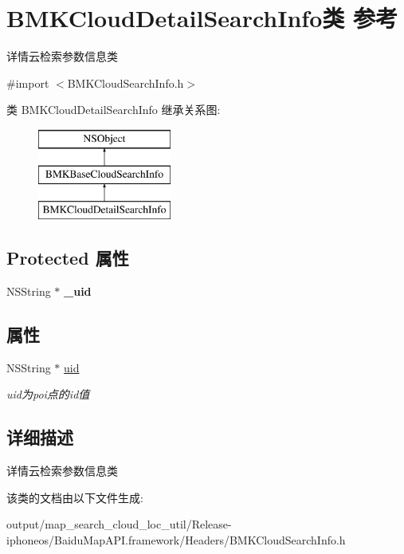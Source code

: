 \hypertarget{interface_b_m_k_cloud_detail_search_info}{}\section{B\+M\+K\+Cloud\+Detail\+Search\+Info类 参考}
\label{interface_b_m_k_cloud_detail_search_info}


详情云检索参数信息类  




{\ttfamily \#import $<$B\+M\+K\+Cloud\+Search\+Info.\+h$>$}

类 B\+M\+K\+Cloud\+Detail\+Search\+Info 继承关系图\+:\begin{figure}[H]
\begin{center}
\leavevmode
\includegraphics[height=3.000000cm]{interface_b_m_k_cloud_detail_search_info}
\end{center}
\end{figure}
\subsection*{Protected 属性}
\begin{DoxyCompactItemize}
\item 
\hypertarget{interface_b_m_k_cloud_detail_search_info_af0561e1d6ce5656002bb7b576ac51b4f}{}N\+S\+String $\ast$ {\bfseries \+\_\+uid}\label{interface_b_m_k_cloud_detail_search_info_af0561e1d6ce5656002bb7b576ac51b4f}

\end{DoxyCompactItemize}
\subsection*{属性}
\begin{DoxyCompactItemize}
\item 
\hypertarget{interface_b_m_k_cloud_detail_search_info_ad553991a75b6d30409a9d3525bea9c52}{}N\+S\+String $\ast$ \hyperlink{interface_b_m_k_cloud_detail_search_info_ad553991a75b6d30409a9d3525bea9c52}{uid}\label{interface_b_m_k_cloud_detail_search_info_ad553991a75b6d30409a9d3525bea9c52}

\begin{DoxyCompactList}\small\item\em uid为poi点的id值 \end{DoxyCompactList}\end{DoxyCompactItemize}


\subsection{详细描述}
详情云检索参数信息类 

该类的文档由以下文件生成\+:\begin{DoxyCompactItemize}
\item 
output/map\+\_\+search\+\_\+cloud\+\_\+loc\+\_\+util/\+Release-\/iphoneos/\+Baidu\+Map\+A\+P\+I.\+framework/\+Headers/B\+M\+K\+Cloud\+Search\+Info.\+h\end{DoxyCompactItemize}

